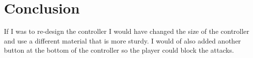 \documentclass{scrartcl}
\begin{document}
\section{Conclusion}

If I was to re-design the controller I would have changed the size of the controller and use a different material that is more sturdy. I would of also added another button at the bottom of the controller so the player could block the attacks.



\end{document}
